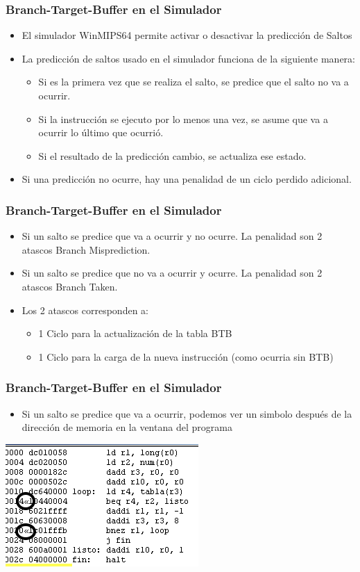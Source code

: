 \documentclass{beamer}
\begin{document}
\begin{frame}
\frametitle{Branch-Target-Buffer en el Simulador}
\begin{itemize}
\item El simulador WinMIPS64 permite activar o desactivar la predicción de Saltos
\item La predicción de saltos usado en el simulador funciona de la siguiente manera:
\begin{itemize}
\item Si es la primera vez que se realiza el salto, se predice que el salto no va a ocurrir.
\item Si la instrucción se ejecuto por lo menos una vez, se asume que va a ocurrir lo último que ocurrió.
\item Si el resultado de la predicción cambio, se actualiza ese estado.
\end{itemize}
\item Si una predicción no ocurre, hay una penalidad de un ciclo perdido adicional.\end{itemize}
\end{frame}


\begin{frame}
\frametitle{Branch-Target-Buffer en el Simulador}
\begin{itemize}
\item Si un salto se predice que va a ocurrir y no ocurre. La penalidad son 2 atascos Branch Misprediction.
\item Si un salto se predice que no va a ocurrir y ocurre. La penalidad son 2 atascos Branch Taken.
\item Los 2 atascos corresponden a:
\begin{itemize}
\item 1 Ciclo para la actualización de la tabla BTB
\item 1 Ciclo para la carga de la nueva instrucción (como ocurria sin BTB)
\end{itemize}
\end{itemize}
\end{frame}

\begin{frame}
\frametitle{Branch-Target-Buffer en el Simulador}
\begin{itemize}
\item Si un salto se predice que va a ocurrir, podemos ver un simbolo después de la dirección de memoria en la ventana del programa
\end{itemize}
\includegraphics[scale=0.65]{btb.png}
\end{frame}
\end{document}
